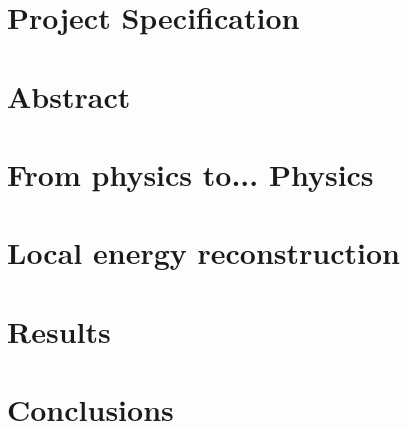 \documentclass[a4paper,10pt,twoside]{report}
\author{\me}
\begin{document}
\linenumbers




\normalsize

\newpage

\chapter*{\textcolor{OpenlabDarkBlue}{Project Specification} }\label{chapter:specification}


\chapter*{\textcolor{OpenlabDarkBlue}{Abstract}} \label{chapter:abstract}


\begingroup
\color{OpenlabDarkBlue}
\tableofcontents
\endgroup

\listoffigures

\listoftables

\lstlistoflistings


\clearpage

\setcounter{page}{10}
\chapter{From physics to... Physics}\label{chapter:01}


\chapter{Local energy reconstruction}\label{chapter:02}

\chapter{Results}\label{chapter:03}


\chapter{Conclusions}\label{chapter:conclusions}


%



\clearpage %
\appendix
{} %


\end{document}
